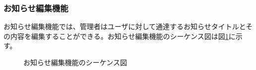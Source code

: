 \documentclass[a4j]{jarticle}
\begin{document}
  \subsubsection{お知らせ編集機能}
  お知らせ編集機能では、管理者はユーザに対して通達するお知らせタイトルとその内容を編集することができる。お知らせ編集機能のシーケンス図は図\ref{fig:admin_news.png}に示す。
  \begin{figure}[H]
    \centering
    \caption{お知らせ編集機能のシーケンス図}
    \label{fig:admin_news.png}
  \end{figure}
\end{document}
